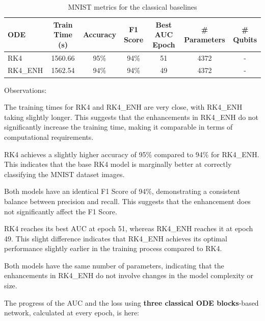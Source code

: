\documentclass[12pt,a4paper]{report}
\begin{document}
\clearpage

\begin{table}[th]\small\linespread{1}
  \label{tab:classical_MNIST_1}
  \centering
  \begin{tabular}{|l|c|c|c|c|c|c|}
    \hline
    \textbf{ODE} & \textbf{Train Time (s)} & \textbf{Accuracy} & \textbf{F1 Score} & \textbf{Best AUC Epoch} & \textbf{\# Parameters} & \textbf{\# Qubits} \\
    \hline
    RK4          & 1560.66                 & 95\%              & 94\%              & 51                      & 4372                   & -                  \\
    RK4\_ENH     & 1562.54                 & 94\%              & 94\%              & 49                      & 4372                   & -                  \\
    \hline
  \end{tabular}
  \caption{MNIST metrics for the classical baselines}
\end{table}

Observations:

The training times for RK4 and RK4\_ENH are very close, with RK4\_ENH taking slightly longer. This suggests that the enhancements in RK4\_ENH do not significantly increase the training time, making it comparable in terms of computational requirements.

RK4 achieves a slightly higher accuracy of 95\% compared to 94\% for RK4\_ENH. This indicates that the base RK4 model is marginally better at correctly classifying the MNIST dataset images.

Both models have an identical F1 Score of 94\%, demonstrating a consistent balance between precision and recall. This suggests that the enhancement does not significantly affect the F1 Score.

RK4 reaches its best AUC at epoch 51, whereas RK4\_ENH reaches it at epoch 49. This slight difference indicates that RK4\_ENH achieves its optimal performance slightly earlier in the training process compared to RK4.

Both models have the same number of parameters, indicating that the enhancements in RK4\_ENH do not involve changes in the model complexity or size.

\clearpage

The progress of the AUC and the loss using \textbf{three classical ODE blocks}-based network, calculated at every epoch, is here:
\end{document}
